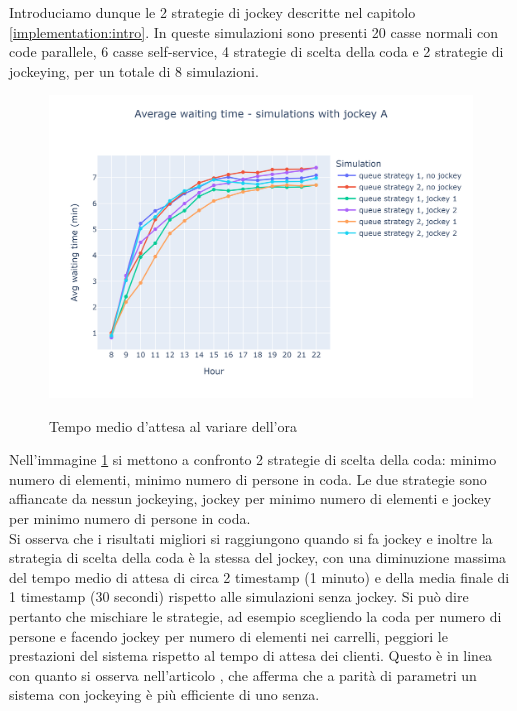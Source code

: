 Introduciamo dunque le 2 strategie di jockey descritte nel capitolo \ref{implementation:intro}. In queste simulazioni sono presenti 20 casse normali con code parallele, 6 casse self-service, 4 strategie di scelta della coda e 2 strategie di jockeying, per un totale di 8 simulazioni.

\begin{figure}[H]
	\centering
	\includegraphics[width=12cm]{"images/results/avg_wt_jockey_a.png"}
	\label{fig:avg_wt_jockey_a}
	\caption{Tempo medio d'attesa al variare dell'ora}
\end{figure}

Nell'immagine \ref{fig:avg_wt_jockey_a} si mettono a confronto 2 strategie di scelta della coda: minimo numero di elementi, minimo numero di persone in coda. Le due strategie sono affiancate da nessun jockeying, jockey per minimo numero di elementi e jockey per minimo numero di persone in coda. \\ 
Si osserva che i risultati migliori si raggiungono quando si fa jockey e inoltre la strategia di scelta della coda è la stessa del jockey, con una diminuzione massima del tempo medio di attesa di circa 2 timestamp (1 minuto) e della media finale di 1 timestamp (30 secondi) rispetto alle simulazioni senza jockey. Si può dire pertanto che mischiare le strategie, ad esempio scegliendo la coda per numero di persone e facendo jockey per numero di elementi nei carrelli, peggiori le prestazioni del sistema rispetto al tempo di attesa dei clienti. Questo è in linea con quanto si osserva nell'articolo \cite{xu1996dynamic}, che afferma	che a parità di parametri un sistema con jockeying è più efficiente di uno senza.

